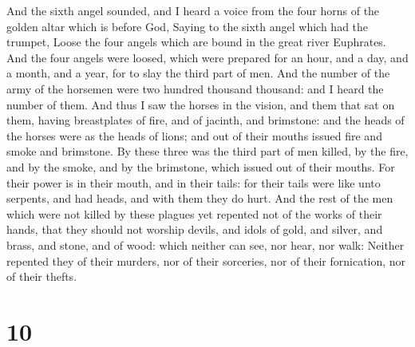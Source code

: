  And the sixth angel sounded, and I heard a voice from
the four horns of the golden altar which is before God, 
Saying to the sixth angel which had the trumpet, Loose the four angels
which are bound in the great river Euphrates.  And the
four angels were loosed, which were prepared for an hour, and a day, and
a month, and a year, for to slay the third part of men. 
And the number of the army of the horsemen were two hundred thousand
thousand: and I heard the number of them.  And thus I saw
the horses in the vision, and them that sat on them, having breastplates
of fire, and of jacinth, and brimstone: and the heads of the horses were
as the heads of lions; and out of their mouths issued fire and smoke and
brimstone.  By these three was the third part of men
killed, by the fire, and by the smoke, and by the brimstone, which
issued out of their mouths.  For their power is in their
mouth, and in their tails: for their tails were like unto serpents, and
had heads, and with them they do hurt.  And the rest of
the men which were not killed by these plagues yet repented not of the
works of their hands, that they should not worship devils, and idols of
gold, and silver, and brass, and stone, and of wood: which neither can
see, nor hear, nor walk:  Neither repented they of their
murders, nor of their sorceries, nor of their fornication, nor of their
thefts.

\hypertarget{section-9}{%
\section{10}\label{section-9}}

